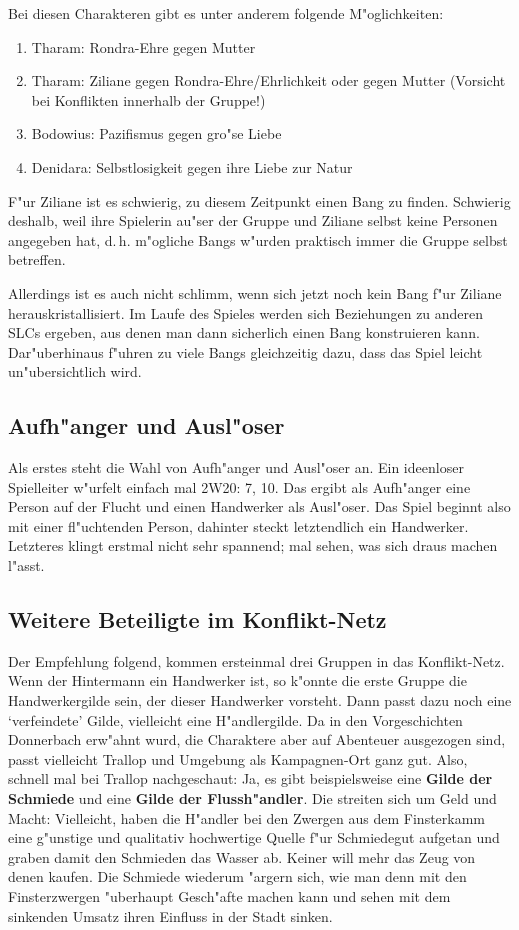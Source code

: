 Bei diesen Charakteren gibt es unter anderem folgende M"oglichkeiten:
\begin{enumerate}
  \item Tharam: Rondra-Ehre gegen Mutter
  \item Tharam: Ziliane gegen Rondra-Ehre/Ehrlichkeit oder gegen Mutter (Vorsicht bei Konflikten innerhalb der Gruppe!)
  \item Bodowius: Pazifismus gegen gro"se Liebe
  \item Denidara: Selbstlosigkeit gegen ihre Liebe zur Natur
\end{enumerate}
F"ur Ziliane ist es schwierig, zu diesem Zeitpunkt einen Bang zu finden. Schwierig deshalb, weil ihre Spielerin au"ser der Gruppe und Ziliane selbst keine Personen angegeben hat, d.\,h. m"ogliche Bangs w"urden praktisch immer die Gruppe selbst betreffen.

Allerdings ist es auch nicht schlimm, wenn sich jetzt noch kein Bang f"ur Ziliane herauskristallisiert. Im Laufe des Spieles werden sich Beziehungen zu anderen SLCs ergeben, aus denen man dann sicherlich einen Bang konstruieren kann. Dar"uberhinaus f"uhren zu viele Bangs gleichzeitig dazu, dass das Spiel leicht un"ubersichtlich wird.



\subsection{Aufh"anger und Ausl"oser}
Als erstes steht die Wahl von Aufh"anger und Ausl"oser an. Ein ideenloser Spielleiter w"urfelt einfach mal 2W20: 7, 10. Das ergibt als Aufh"anger eine Person auf der Flucht und einen Handwerker als Ausl"oser. Das Spiel beginnt also mit einer fl"uchtenden Person, dahinter steckt letztendlich ein Handwerker. Letzteres klingt erstmal nicht sehr spannend; mal sehen, was sich draus machen l"asst.

\subsection{Weitere Beteiligte im Konflikt-Netz}
Der Empfehlung folgend, kommen ersteinmal drei Gruppen in das Konflikt-Netz. Wenn der Hintermann ein Handwerker ist, so k"onnte die erste Gruppe die Handwerkergilde sein, der dieser Handwerker vorsteht. Dann passt dazu noch eine `verfeindete' Gilde, vielleicht eine H"andlergilde. Da in den Vorgeschichten Donnerbach erw"ahnt wurd, die Charaktere aber auf Abenteuer ausgezogen sind, passt vielleicht Trallop und Umgebung als Kampagnen-Ort ganz gut. Also, schnell mal bei Trallop nachgeschaut: Ja, es gibt beispielsweise eine \textbf{Gilde der Schmiede} und eine \textbf{Gilde der Flussh"andler}. Die streiten sich um Geld und Macht: Vielleicht, haben die H"andler bei den Zwergen aus dem Finsterkamm eine g"unstige und qualitativ hochwertige Quelle f"ur Schmiedegut aufgetan und graben damit den Schmieden das Wasser ab. Keiner will mehr das Zeug von denen kaufen. Die Schmiede wiederum "argern sich, wie man denn mit den Finsterzwergen "uberhaupt Gesch"afte machen kann und sehen mit dem sinkenden Umsatz ihren Einfluss in der Stadt sinken.

